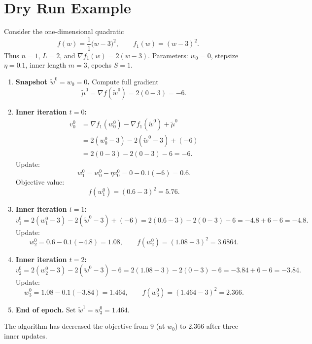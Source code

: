 \documentclass{article}
\begin{document}
\section*{Dry Run Example}
Consider the one‑dimensional quadratic
\[
    f(w)=\frac{1}{1}\big( w-3\big)^{2},\qquad f_1(w)=(w-3)^2.
\]
Thus $n=1$, $L=2$, and $\nabla f_1(w)=2(w-3)$.  
Parameters: $w_0=0$, stepsize $\eta=0.1$, inner length $m=3$, epochs $S=1$.

\begin{enumerate}[label=Step \arabic*:, leftmargin=*]
\item \textbf{Snapshot $\tilde{w}^{0}=w_0=0$.} Compute full gradient
\[
\tilde{\mu}^{0}= \nabla f(\tilde{w}^{0}) = 2(0-3) = -6.
\]

\item \textbf{Inner iteration $t=0$:}
\begin{align*}
v_{0}^{0}&=\nabla f_1(w_{0}^{0})-\nabla f_1(\tilde{w}^{0})+\tilde{\mu}^{0}\\
        &=2(w_{0}^{0}-3)-2(\tilde{w}^{0}-3)+(-6)\\
        &=2(0-3)-2(0-3)-6 = -6.
\end{align*}
Update:
\[
w_{1}^{0}=w_{0}^{0}-\eta v_{0}^{0}=0-0.1(-6)=0.6.
\]
Objective value:
\[
f(w_{1}^{0})=(0.6-3)^2=5.76.
\]

\item \textbf{Inner iteration $t=1$:}
\[
v_{1}^{0}=2(w_{1}^{0}-3)-2(\tilde{w}^{0}-3)+(-6)
        =2(0.6-3)-2(0-3)-6 = -4.8+6-6 = -4.8.
\]
Update:
\[
w_{2}^{0}=0.6-0.1(-4.8)=1.08,\qquad 
f(w_{2}^{0})=(1.08-3)^2=3.6864.
\]

\item \textbf{Inner iteration $t=2$:}
\[
v_{2}^{0}=2(w_{2}^{0}-3)-2(\tilde{w}^{0}-3)-6
        =2(1.08-3)-2(0-3)-6 = -3.84+6-6 = -3.84.
\]
Update:
\[
w_{3}^{0}=1.08-0.1(-3.84)=1.464,\qquad 
f(w_{3}^{0})=(1.464-3)^2=2.366.
\]

\item \textbf{End of epoch.} Set $\tilde{w}^{1}=w_{3}^{0}=1.464$.
\end{enumerate}
The algorithm has decreased the objective from $9$ (at $w_0$) to $2.366$ after three inner updates.

\newpage
\end{document}
